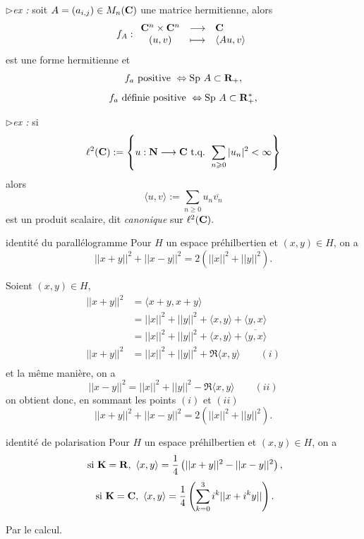 \documentclass[a4paper,11pt, twoside]{article}
\begin{document}
$\triangleright$\emph{ex :} soit $A=\left(a_{i,j}\right)\in M_n(\mathbf C)$ une matrice hermitienne, alors 
$$f_A:\begin{array}{ccl}
  \mathbf C^n\times\mathbf C^n&\longrightarrow&\mathbf C\\
  (u,v)&\longmapsto&\langle Au,v\rangle
\end{array}$$
est une forme hermitienne et 
$$f_a\text{ positive }\Leftrightarrow\mathrm{Sp}\ A\subset\R_+,$$
$$f_a\text{ définie positive }\Leftrightarrow\mathrm{Sp}\ A\subset\mathbf R_+^*,$$


$\triangleright$\emph{ex :} si 
$$\ell^2(\mathbf C):=\left\{u:\mathbf N\longrightarrow\mathbf C\text{ t.q. } \sum_{n\geqslant 0}|u_n|^2<\infty\right\}$$
alors 
$$\langle u,v\rangle:=\sum_{n\geqslant 0}u_n\overline{v_n}$$
est un produit scalaire, dit \emph{canonique} sur $\ell^2(\mathbf C).$


\begin{propC}{identité du parallélogramme}
  Pour $H$ un espace préhilbertien et $(x,y)\in H$, on a 
  $$||x+y||^2+||x-y||^2=2\left(||x||^2+||y||^2\right).$$
\end{propC}


\begin{Proof}
  Soient $(x,y)\in H$,
  \begin{align*}
    ||x+y||^2&=\langle x+y,x+y\rangle\\
    &=||x||^2+||y||^2+\langle x,y\rangle+\langle y,x\rangle\\
    &=||x||^2+||y||^2+\langle x,y\rangle+\overline{\langle y,x\rangle}\\
    ||x+y||^2&=||x||^2+||y||^2+\Re \langle x,y\rangle\qquad (i)\\
  \end{align*}
  et la même manière, on a 
  $$||x-y||^2=||x||^2+||y||^2-\Re \langle x,y\rangle\qquad (ii)$$
  on obtient donc, en sommant les points $(i)$ et $(ii)$
  $$||x+y||^2+||x-y||^2=2\left(||x||^2+||y||^2\right).$$
\end{Proof}


\begin{propC}{identité de polarisation}
  Pour $H$ un espace préhilbertien et $(x,y)\in H$, on a 
  $$\text{ si }\mathbf K=\mathbf R,\ \langle x,y\rangle=\frac14\left(||x+y||^2-||x-y||^2\right),$$
  $$\text{ si }\mathbf K=\mathbf C,\ \langle x,y\rangle=\frac14\left(\sum_{k=0}^3i^k||x+i^ky||\right).$$
\end{propC}


\begin{Proof}
  Par le calcul.
\end{Proof}
\end{document}
